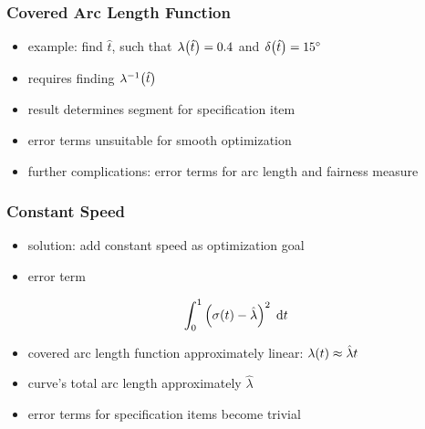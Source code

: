 \documentclass[mathserif]{beamer}
\begin{document}
		\begin{frame}
			\frametitle{Covered Arc Length Function}
			\begin{itemize}
				\item example: find \(\hat{t}\), such that \(\lambda\!\left( \hat{t} \right) = 0.4\) and \(\delta\!\left( \hat{t} \right) = 15^\circ\)
			\end{itemize}
			\begin{itemize}
				\item requires finding \(\lambda^{-1}\!\left( \hat{t} \right)\)
				\item result determines segment for specification item
				\item error terms unsuitable for smooth optimization
				\item further complications: error terms for arc length and fairness measure
			\end{itemize}
		\end{frame}

		\begin{frame}
			\frametitle{Constant Speed}
			\begin{itemize}
				\item solution: add constant speed as optimization goal
				\item error term
			\end{itemize}
			\begin{equation*}
				\int_{0}^{1} \left( \sigma\!\left( t \right) - \hat{\lambda} \right)^2 \; \mathrm{d}t
			\end{equation*}
			\begin{itemize}
				\item covered arc length function approximately linear: \(\lambda\!\left( t \right) \approx \hat{\lambda}t\)
				\item curve's total arc length approximately \(\hat{\lambda}\)
				\item error terms for specification items become trivial
			\end{itemize}
		\end{frame}
\end{document}
